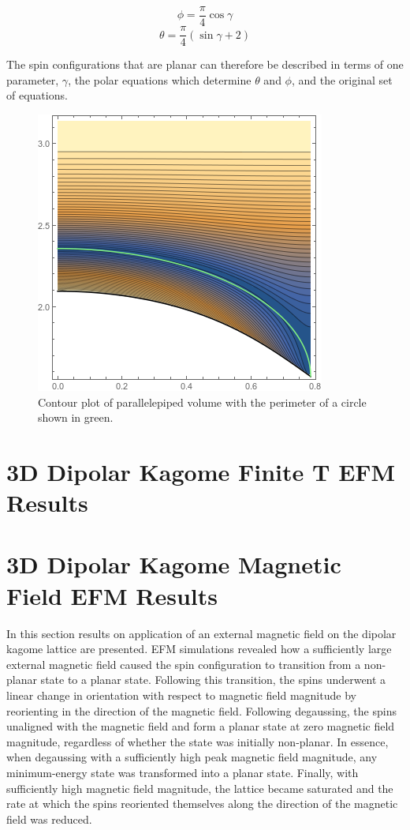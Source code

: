 \begin{equation}
\phi = \frac{\pi}{4}\cos{\gamma} 
\end{equation}
\begin{equation}
\theta = \frac{\pi}{4}(\sin{\gamma}+2)
\end{equation}

The spin configurations that are planar can therefore be described in terms of one parameter, $\gamma$, the polar equations which determine $\theta$ and $\phi$, and the original set of equations.  

\begin{figure}[h]
\includegraphics[width=.5\linewidth]{img/groundstatevol_withplanarborder.png} 
    \caption{Contour plot of parallelepiped volume with the perimeter of a circle shown in green.} 
\end{figure}
\clearpage
\section{3D Dipolar Kagome Finite T EFM Results}


\section{3D Dipolar Kagome Magnetic Field EFM Results}

In this section results on application of an external magnetic field on the dipolar kagome lattice are presented. EFM simulations revealed how a sufficiently large external magnetic field caused the spin configuration to transition from a non-planar state to a planar state. Following this transition, the spins underwent a linear change in orientation with respect to magnetic field magnitude by reorienting in the direction of the magnetic field. Following degaussing, the spins unaligned with the magnetic field and form a planar state at zero magnetic field magnitude, regardless of whether the state was initially non-planar. In essence, when degaussing with a sufficiently high peak magnetic field magnitude, any minimum-energy state was transformed into a planar state. Finally, with sufficiently high magnetic field magnitude, the lattice became saturated and the rate at which the spins reoriented themselves along the direction of the magnetic field was reduced. 

